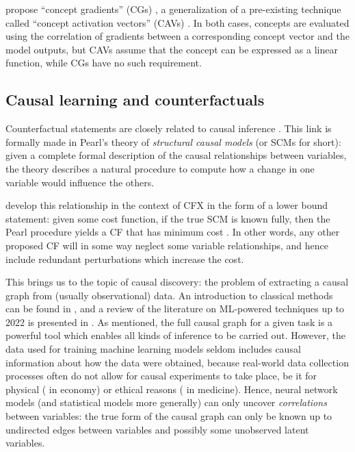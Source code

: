 \documentclass[../main.tex]{subfiles}
\begin{document}
\citeauthor{baiConcept2022} propose ``concept gradients'' (CGs) \cite{baiConcept2022}, a generalization of a pre-existing technique called ``concept activation vectors'' (CAVs) \cite{kimInterpretability2018}.
In both cases, concepts are evaluated using the correlation of gradients between a corresponding concept vector and the model outputs, but CAVs assume that the concept can be expressed as a linear function, while CGs have no such requirement.

\subsection{Causal learning and counterfactuals}


Counterfactual statements are closely related to causal inference \cite{morganCounterfactuals2015}.
This link is formally made in Pearl's theory of \emph{structural causal models} (or SCMs for short): given a complete formal description of the causal relationships between variables, the theory describes a natural procedure to compute how a change in one variable would influence the others. 

\citeauthor{karimiAlgorithmic2020} develop this relationship in the context of CFX in the form of a lower bound statement: given some cost function, if the true SCM is known fully, then the Pearl procedure yields a CF that has minimum cost \cite{karimiAlgorithmic2020}.
In other words, any other proposed CF will in some way neglect some variable relationships, and hence include redundant perturbations which increase the cost.

This brings us to the topic of causal discovery: the problem of extracting a causal graph from (usually observational) data.
An introduction to classical methods can be found in \cite{cunninghamCausal2021}, and a review of the literature on ML-powered techniques up to 2022 is presented in \cite{vowelsYa2023}.
As mentioned, the full causal graph for a given task is a powerful tool which enables all kinds of inference to be carried out.
However, the data used for training machine learning models seldom includes causal information about how the data were obtained, because real-world data collection processes often do not allow for causal experiments to take place, be it for physical (\eg{} in economy) or ethical reasons (\eg{} in medicine).
Hence, neural network models (and statistical models more generally) can only uncover \emph{correlations} between variables: the true form of the causal graph can only be known up to undirected edges between variables and possibly some unobserved latent variables.
\end{document}
